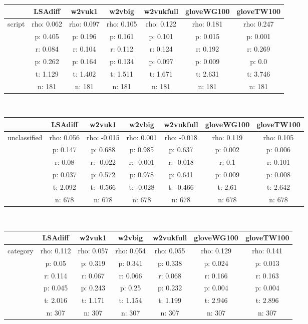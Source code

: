 \documentclass{article}
\begin{document}
\begin{tabular}{ccccccc|}\cline{2-7}
&\multicolumn{1}{|c}{LSAdiff} & w2vuk1 & w2vbig & w2vukfull & gloveWG100 & gloveTW100 \\\hline
\multicolumn{1}{|c|}{\multirow{6}{*}{script}} & rho: 0.062 & rho: 0.097 & rho: 0.105 & rho: 0.122 & rho: 0.181 & rho: 0.247 \\
\multicolumn{1}{|c|}{} & p: 0.405 & p: 0.196 & p: 0.161 & p: 0.101 & p: 0.015 & p: 0.001 \\
\multicolumn{1}{|c|}{} & r: 0.084 & r: 0.104 & r: 0.112 & r: 0.124 & r: 0.192 & r: 0.269 \\
\multicolumn{1}{|c|}{} & p: 0.262 & p: 0.164 & p: 0.134 & p: 0.097 & p: 0.009 & p: 0.0 \\
\multicolumn{1}{|c|}{} & t: 1.129 & t: 1.402 & t: 1.511 & t: 1.671 & t: 2.631 & t: 3.746 \\
\multicolumn{1}{|c|}{} & n: 181 & n: 181 & n: 181 & n: 181 & n: 181 & n: 181 \\
\hline
\end{tabular}\\
\begin{tabular}{ccccccc|}\cline{2-7}
&\multicolumn{1}{|c}{LSAdiff} & w2vuk1 & w2vbig & w2vukfull & gloveWG100 & gloveTW100 \\\hline
\multicolumn{1}{|c|}{\multirow{6}{*}{unclassified}} & rho: 0.056 & rho: -0.015 & rho: 0.001 & rho: -0.018 & rho: 0.119 & rho: 0.105 \\
\multicolumn{1}{|c|}{} & p: 0.147 & p: 0.688 & p: 0.985 & p: 0.637 & p: 0.002 & p: 0.006 \\
\multicolumn{1}{|c|}{} & r: 0.08 & r: -0.022 & r: -0.001 & r: -0.018 & r: 0.1 & r: 0.101 \\
\multicolumn{1}{|c|}{} & p: 0.037 & p: 0.572 & p: 0.978 & p: 0.641 & p: 0.009 & p: 0.008 \\
\multicolumn{1}{|c|}{} & t: 2.092 & t: -0.566 & t: -0.028 & t: -0.466 & t: 2.61 & t: 2.642 \\
\multicolumn{1}{|c|}{} & n: 678 & n: 678 & n: 678 & n: 678 & n: 678 & n: 678 \\
\hline
\end{tabular}\\
\begin{tabular}{ccccccc|}\cline{2-7}
&\multicolumn{1}{|c}{LSAdiff} & w2vuk1 & w2vbig & w2vukfull & gloveWG100 & gloveTW100 \\\hline
\multicolumn{1}{|c|}{\multirow{6}{*}{category}} & rho: 0.112 & rho: 0.057 & rho: 0.054 & rho: 0.055 & rho: 0.129 & rho: 0.141 \\
\multicolumn{1}{|c|}{} & p: 0.05 & p: 0.319 & p: 0.341 & p: 0.338 & p: 0.024 & p: 0.013 \\
\multicolumn{1}{|c|}{} & r: 0.114 & r: 0.067 & r: 0.066 & r: 0.068 & r: 0.166 & r: 0.163 \\
\multicolumn{1}{|c|}{} & p: 0.045 & p: 0.243 & p: 0.25 & p: 0.232 & p: 0.004 & p: 0.004 \\
\multicolumn{1}{|c|}{} & t: 2.016 & t: 1.171 & t: 1.154 & t: 1.199 & t: 2.946 & t: 2.896 \\
\multicolumn{1}{|c|}{} & n: 307 & n: 307 & n: 307 & n: 307 & n: 307 & n: 307 \\
\hline
\end{tabular}\\
\end{document}
